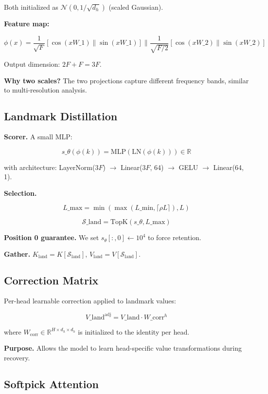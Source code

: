 Both initialized as $\mathcal{N}(0, 1/\sqrt{d_h})$ (scaled Gaussian).

\textbf{Feature map:}

\[
\phi(x) = \frac{1}{\sqrt{F}} [\cos(x W\_1) \| \sin(x W\_1)] \| \frac{1}{\sqrt{F/2}} [\cos(x W\_2) \| \sin(x W\_2)]
\tag{4.2}
\]

Output dimension: $2F + F = 3F$.

\textbf{Why two scales?} The two projections capture different frequency 
bands, similar to multi-resolution analysis.

\subsection{Landmark Distillation}

\textbf{Scorer.} A small MLP:

\[
s\_\theta(\phi(k)) = \text{MLP}(\text{LN}(\phi(k))) \in \mathbb{R}
\tag{4.3}
\]

with architecture: LayerNorm($3F$) $\to$ Linear($3F$, 64) $\to$ GELU $\to$ Linear(64, 1).

\textbf{Selection.}

\[
L\_\text{max} = \min\!\left(\max(L\_\text{min}, \lceil \rho L \rceil), L\right)
\tag{4.4}
\]

\[
\mathcal{S}\_\text{land} = \text{TopK}(s\_\theta, L\_\text{max})
\tag{4.5}
\]

\textbf{Position 0 guarantee.} We set $s_\theta[:, 0] \leftarrow 10^4$ to force 
retention.

\textbf{Gather.} $K_\text{land} = K[\mathcal{S}_\text{land}]$, $V_\text{land} = V[\mathcal{S}_\text{land}]$.

\subsection{Correction Matrix}

Per-head learnable correction applied to landmark values:

\[
V\_\text{land}^\text{adj} = V\_\text{land} \cdot W\_\text{corr}^h
\tag{4.6}
\]

where $W_\text{corr} \in \mathbb{R}^{H \times d_h \times d_h}$ is 
initialized to the identity per head.

\textbf{Purpose.} Allows the model to learn head-specific value transformations 
during recovery.

\subsection{Softpick Attention}

